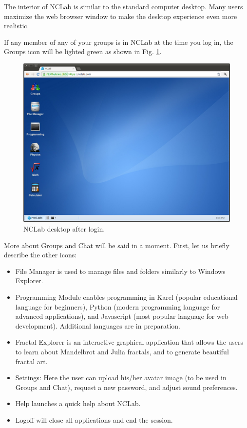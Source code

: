 \documentclass[article,A4,12pt]{llncs}
\begin{document}
The interior of NCLab is similar to the standard computer desktop. Many users maximize 
the web browser window to make the desktop experience even more realistic.

If any member of any of your groups is in NCLab at the time you log in, the Groups icon 
will be lighted green as shown in Fig. \ref{fig:desktop}. 

\begin{figure}[!ht]
\begin{center}
\includegraphics[width=\textwidth]{img/desktop.png}
\end{center}
\caption{NCLab desktop after login.}
\label{fig:desktop}
\end{figure}

\noindent
More about Groups and Chat will be said in a moment. First, let us briefly 
describe the other icons:

\begin{itemize}
\item File Manager is used to manage files and folders similarly to Windows Explorer. 
\item Programming Module enables programming in Karel (popular educational language for beginners),
      Python (modern programming language for advanced applications), and Javascript 
      (most popular language for web development). Additional languages are in preparation.
\item Fractal Explorer is an interactive graphical application that allows the users
      to learn about Mandelbrot and Julia fractals, and to generate beautiful fractal art.
\item Settings: Here the user can upload his/her avatar image (to be used in Groups and Chat), 
      request a new password, and adjust sound preferences.
\item Help launches a quick help about NCLab.
\item Logoff will close all applications and end the session.
\end{itemize}
\end{document}
